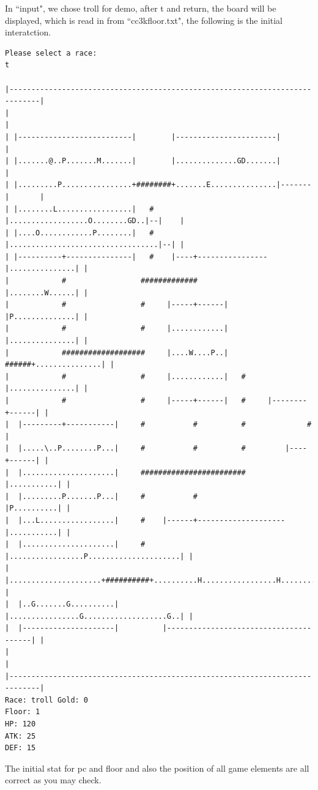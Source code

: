 \documentclass[11pt]{article}
\theoremstyle{plain}
\begin{document}
In ``input", we chose troll for demo, after t and return, the board will be 
displayed, which is read in from ``cc3kfloor.txt", the following is the initial
interatction.
\begin{Verbatim}[fontsize=\scriptsize]
Please select a race:
t

|-----------------------------------------------------------------------------|
|                                                                             |
| |--------------------------|        |-----------------------|               |
| |.......@..P.......M.......|        |..............GD.......|               |
| |.........P................+########+.......E...............|-------|       |
| |........L.................|   #    |..................O........GD..|--|    |
| |....O............P........|   #    |..................................|--| |
| |----------+---------------|   #    |----+----------------|...............| |
|            #                 #############                |........W......| |
|            #                 #     |-----+------|         |P..............| |
|            #                 #     |............|         |...............| |
|            ###################     |....W....P..|   ######+...............| |
|            #                 #     |............|   #     |...............| |
|            #                 #     |-----+------|   #     |--------+------| |
|  |---------+-----------|     #           #          #              #        |
|  |.....\..P........P...|     #           #          #         |----+------| |
|  |.....................|     ########################         |...........| |
|  |.........P.......P...|     #           #                    |P..........| |
|  |...L.................|     #    |------+--------------------|...........| |
|  |.....................|     #    |.................P.....................| |
|  |.....................+##########+..........H.................H..........| |
|  |..G.......G..........|          |................G...................G..| |
|  |---------------------|          |---------------------------------------| |
|                                                                             |
|-----------------------------------------------------------------------------|
Race: troll Gold: 0                                                    Floor: 1
HP: 120
ATK: 25
DEF: 15
\end{Verbatim}
The initial stat for pc and floor and also the position of all game elements
are all correct as you may check.
\end{document}
